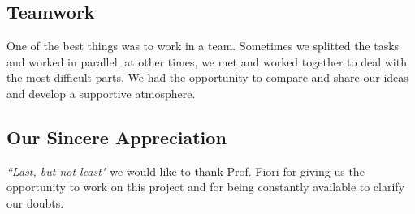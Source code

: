 \documentclass[12pt, a4paper]{paper}
\begin{document}
\subsection{Teamwork}
One of the best things was to work in a team.
Sometimes we splitted the tasks and worked in parallel, at other times,
we met and worked together to deal with the most difficult parts.
We had the opportunity to compare and share our ideas and develop a supportive atmosphere.

\subsection{Our Sincere Appreciation}
\textit{“Last, but not least"} we would like to thank Prof. Fiori for giving us the opportunity to work on this 
project and for being  constantly available to clarify our doubts.



\end{document}

